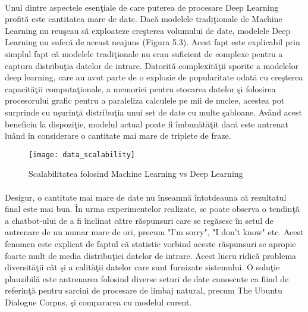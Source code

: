 \paragraph{}
Unul dintre aspectele esen\c tiale de care puterea de procesare Deep Learning profit\u a este cantitatea mare de date. Dac\u a modelele tradi\c tionale de Machine Learning nu reu\c seau s\u a exploateze cre\c sterea volumului de date, modelele Deep Learning nu sufer\u a de aceast neajuns (Figura 5.3). Acest fapt este explicabil prin simplul fapt c\u a modelele tradi\c tionale nu erau suficient de complexe pentru a captura distribu\c tia datelor de intrare. Datorit\u a complexit\u a\c tii sporite a modelelor deep learning, care au avut parte de o explozie de popularitate odat\u a cu cre\c sterea capacit\u a\c tii computa\c tionale, a memoriei pentru stocarea datelor \c si folosirea procesorului grafic pentru a paraleliza calculele pe mii de nuclee, acestea pot surprinde cu u\c surin\c t\u a distribu\c tia unui set de date cu multe \c sabloane. Av\^ and acest beneficiu la dispozi\c tie, modelul actual poate fi \^ imbun\u at\u a\c tit dac\u a este antrenat lu\^ and \^ in considerare o cantitate mai mare de triplete de fraze.

\begin{figure}[H]
\centering
\texttt{[image: data\_scalability]}
\caption{Scalabilitatea folosind Machine Learning vs Deep Learning}
\end{figure}

\paragraph{}
Desigur, o cantitate mai mare de date nu \^ inseamn\u a \^ intotdeauna c\u a rezultatul final este mai bun. \^ In urma experimentelor realizate, se poate observa o tendin\c t\u a a chatbot-ului de a fi \^ inclinat c\u atre r\u aspunsuri care se reg\u asesc \^ in setul de antrenare de un numar mare de ori, precum "I'm sorry", "I don't know" etc. Acest fenomen este explicat de faptul c\u a statistic vorbind aceste r\u aspunsuri se apropie foarte mult de media distribu\c tiei datelor de intrare. Acest lucru ridic\u a problema diversit\u a\c tii c\^ at \c si a calit\u a\c tii datelor care sunt furnizate sistemului. O solu\c tie plauzibil\u a este antrenarea folosind diverse seturi de date cunoscute ca fiind de referin\c t\u a pentru sarcini de procesare de limbaj natural, precum The Ubuntu Dialogue Corpus, \c si compararea cu modelul curent.




